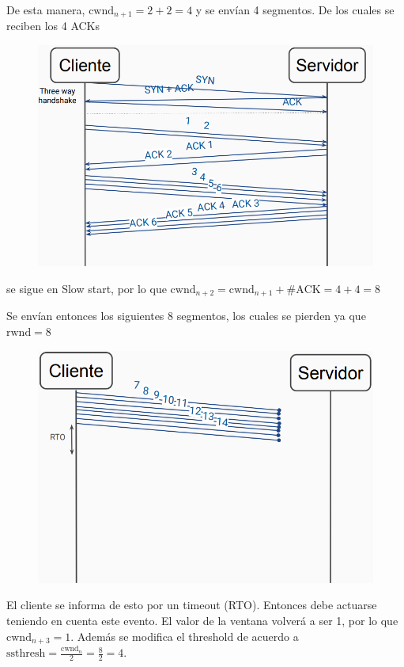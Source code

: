 De esta manera, $\mathrm{cwnd}_{n+1} = 2 + 2 = 4 $ y se envían 4 segmentos. De los cuales se reciben los 4 ACKs


\begin{figure}[H]
\centering
\includegraphics[width=\textwidth]{imagenes/resolucion2.png}
\end{figure}

se sigue en Slow start, por lo que  $\mathrm{cwnd}_{n+2} = \mathrm{cwnd}_{n+1} + \#\mathrm{ACK} = 4 + 4 = 8 $

Se envían entonces los siguientes 8 segmentos, los cuales se pierden ya que $ \mathrm{rwnd} = 8 $

\begin{figure}[H]
\centering
\includegraphics[width=\textwidth]{imagenes/resolucion3.png}
\end{figure}

El cliente se informa de esto por un timeout (RTO). Entonces debe actuarse teniendo en cuenta este evento. El valor de la ventana volverá a ser 1, por lo que $ \mathrm{cwnd}_{n+3} = 1  $. Además se modifica el threshold de acuerdo a $ \mathrm{ssthresh} = \frac{\mathrm{cwnd}_n}{2}  = \frac{8}{2} = 4$.

